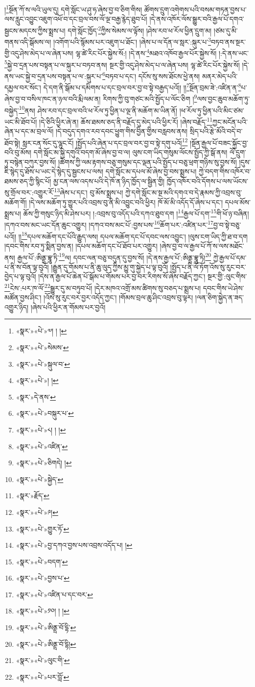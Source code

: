 །\footnote{«སྣར་»«པེ་»༧། ། །}སྔོན་ཀོ་ས་ལའི་ཡུལ་དུ། དགེ་སློང་ཡ་ཤུ་ཧ་ཞེས་བྱ་བ་ཅིག་གིས། ཚོགས་དྲུག་འགེགས་པའི་བསམ་གཏན་བྱས་པ་ལས་རླུང་འབྱུང་འཇུག་འཕོ་བ་དང་བྲལ་བས་ལོ་ལྔ་བརྒྱ་རྙེད་ཐུབ་པོ། །དེ་ནས་འཁོར་ལོས་སྒྱུར་བའི་རྒྱལ་པོ་དགའ་སྦྱངས་མདངས་ཀྱིས་སྨྲས་པ། དགེ་སློང་ཁྱོད་\footnote{«སྣར་»«པེ་»སེམས་}ཀྱིས་སེམས་ལ་ལྟོས། །ཤེས་རབ་ཕ་རོལ་ཕྱིན་དྲུག་མ། །ཙམ་དུ་མི་གནས་འདི་སྒོམས་ལ། །འགོག་པའི་སྙོམས་པར་འཇུག་པ་ཐོང་། །ཞེས་པ་ལ་དོན་ལ་སླར་:སྐུར་པ་\footnote{«སྣར་»«པེ་»སྐུལ་བ་}བཏབ་ནས་སྔར་གྱི་འདུ་ཤེས་མེད་པ་ལ་ཞེན་པས། ལྷ་ཚེ་རིང་པོར་སྐྱེས་སོ:། །དེ་ནས་\footnote{«སྣར་»«པེ་»། །}མཐའ་འཁོབ་རྒྱལ་པོར་སྐྱེས་སོ། །:དེ་ནས་ཡང་\footnote{«སྣར་»དེ་ནས་}སྐྱེ་བ་དྲན་པས་བསྟན་པ་ལ་སྐུར་པ་བཏབ་ནས། སྔར་གྱི་འདུ་ཤེས་མེད་པ་ལ་ཞེན་པས། ལྷ་ཚེ་རིང་པོར་སྐྱེས་སོ། །དེ་ནས་ཡང་སྐྱེ་བ་དྲན་པས་བསྟན་པ་ལ་:སྐུར་པ་\footnote{«སྣར་»«པེ་»བསྐུར་པ་}བཏབ་པ་དང་། དངོས་སུ་སས་ཐོངས་ཕྱེ་ནས། མནར་མེད་པའི་དམྱལ་བར་སོང་། དེ་དག་ནི་སྒོམ་པ་དམིགས་པ་དང་བྲལ་བར་བྱ་བ་སྟེ་བརྒྱད་པའོ།། །།\footnote{«སྣར་»«པེ་»༨། ། །}སྔོན་བྲམ་ཟེ་:འཛིན་ན་\footnote{«སྣར་»«པེ་»འཛིན་}པ་ཞེས་བྱ་བ་བསིལ་ཁང་ན་ཉལ་བའི་རྨི་ལམ་ན། རིགས་ཀྱི་བུ་གཙང་མའི་སྤྱོད་པ་ལོང་ཅིག །\footnote{«སྣར་»«པེ་»ཅིགདེ། །}ལས་བྱང་ཆུབ་མཆོག་ཏུ་བསྐྱེད་\footnote{«སྣར་»«པེ་»སྐྱེད་}ནས། ཤེས་རབ་དང་བྲལ་བའི་ཕ་རོལ་ཏུ་ཕྱིན་པ་ལྔ་ནི་མཆོག་མ་ཡིན་ནོ། །ཕ་རོལ་ཏུ་ཕྱིན་པའི་མིང་ཙམ་ཡང་མི་ཐོབ་པོ། །དེ་ཅིའི་ཕྱིར་ཞེ་ན། ཆོས་ཐམས་ཅད་ནི་བརྗོད་དུ་མེད་པའི་ཕྱིར་རོ། །ཞེས་བརྗོད་\footnote{«སྣར་»རྗོད་}ཀྱང་མངོན་པའི་ཞེན་པ་དང་མ་བྲལ་ལོ། །དེ་བདུད་དགའ་རབ་དབང་ཕྱུག་གིས་བྱིན་གྱིས་བརླབས་ནས། སྲིད་པའི་རྩེ་མོའི་བདེ་བ་ཐོབ་སྟེ། སླར་ངན་སོང་དུ་ལྷུང་ངོ། །སྤྱོད་པའི་ཞེན་པ་དང་བྲལ་བར་བྱ་བ་སྟེ་དགུ་པའོ།\footnote{«སྣར་»«པེ་»༩།} །སྔོན་རྒྱལ་པོ་བཟང་སྐྱོང་བྱ་བའི་བུ་མོས། དགེ་སློང་མ་སྐྱེ་དགུའི་བདག་མོ་ཞེས་བྱ་བ་ལ། ལུས་ངག་ཡིད་གསུམ་ལོངས་སྤྱོད་ཀྱི་སྒོ་ནས། ལོ་དྲུག་ཏུ་བསྙེན་བཀུར་བྱས་སོ། །ཚོགས་ཀྱི་ལམ་རྟགས་བཅུ་གསུམ་དང་ལྡན་པའི་སྤྱོད་པ་བཅུ་ཕྲག་གཉིས་སུ་བྱས་སོ། །དུས་ཇི་སྙེད་དུ་ཐོས་པ་ཡང་དེ་སྙེད་དུ་སྦྱངས་པ་ལས། དགེ་སློང་མ་དཔལ་མོ་ཞེས་བྱ་བས་སྨྲས་པ། ཀྱེ་བདག་གིས་འཁོར་བ་ཐམས་ཅད་ཀྱི་སྙིང་པོ། མྱ་ངན་ལས་འདས་པའི་དེ་ཁོ་ན་ཉིད་ཁྱོད་ལ་སྦྱིན་གྱི། ཁྱོད་འཁོར་བའི་དོགས་པ་ལས་ཡོངས་སུ་གྲོལ་བར་:འགྱུར་རོ་\footnote{«སྣར་»«པེ་»གྱུར་ཏོ་}ཞེས་པ་དང་། བུ་མོས་སྨྲས་པ། ཀྱེ་དགེ་སློང་མ་སྔ་མའི་དགའ་བ་དེ་རྣམས་ཀྱི་འབྲས་བུ་མཆོག་གོ། །དེ་ལས་མཆོག་ཏུ་གྱུར་པའི་འབྲས་བུ་ནི་མི་འབྱུང་བའི་ཕྱིར། ཁོ་མོ་མི་འདོད་དོ་ཞེས་པ་དང་། དཔལ་མོས་སྨྲས་པ། ཆོས་ཀྱི་གསུང་ཉིད་མི་ཤེས་པར། །:འབྲས་བུ་འདོད་པའི་དཀའ་ཐུབ་དག །\footnote{«སྣར་»«པེ་»བྱ་དཀའ་བྱས་པས་འབྲས་འདོད་པ། །}རྒྱལ་པོ་དག་\footnote{«སྣར་»«པེ་»བདག་}གི་ཕོ་ཉ་བཞིན། །དཀའ་བས་མང་ཡང་དོན་ཆུང་འགྱུར། །དཀའ་བས་མང་པོ་:བྱས་པས་\footnote{«སྣར་»«པེ་»བྱས་པ་}ཆོག་པར་:འཛིན་པར་\footnote{«སྣར་»«པེ་»འཛིན་པ་དང་བར་}བྱ་བ་སྟེ་བཅུ་པའོ།། །།\footnote{«སྣར་»«པེ་»༡༠། ། །}དཔལ་མཆོག་དང་པོའི་རྒྱུད་ལས། དཔལ་མཆོག་དང་པོ་དབང་ལས་འབྱུང་། །ལུས་ངག་ཡིད་ཀྱི་ཐ་བ་དག །དབང་གིས་རབ་ཏུ་སྨིན་བྱས་ན། །དཔལ་མཆོག་དང་པོ་ཐོབ་པར་འགྱུར། །ཞེས་བྱ་བ་ལ་རྒྱལ་པོ་ཀོ་ས་ལས་མཐོང་ནས། རྒྱལ་པོ་:ཨིནྡྲ་བྷཱུ་ཏི་\footnote{«སྣར་»«པེ་»ཨིནྡྲ་བོ་དྷི་}ལ། དབང་ལན་བཅུ་བདུན་དུ་བྱས་སོ། །དེ་ནས་རྒྱལ་པོ་:ཨིནྡྲ་བྷཱུ་ཏི།\footnote{«སྣར་»«པེ་»ཨིནྡྲ་བོ་དྷི།} ཀྱེ་རྒྱལ་པོ་དམ་པ་ནི་ས་བོན་ལྟ་བུའོ། །རྒྱུན་དུ་གོམས་པ་ནི་ཆུ་ལུད་ཀྱིས་མྱུ་གུ་སྐྱེད་པ་ལྟ་བུའོ། །སྤྱོད་པ་ནི་ལོ་ཏོག་འོས་སུ་རུང་བར་བྱེད་པ་ལྟ་བུའོ། །དེས་ན་རྒྱལ་པོ་ཆེན་པོ་སྒོམ་པ་གོམས་པར་བྱ་བར་རིགས་སོ་ཞེས་བརྗོད་ཀྱང་། སྔར་གྱི་:ལུང་གིས་\footnote{«སྣར་»«པེ་»ལུང་གི་}ངེས་:པར་ཁ་ལོ་\footnote{«སྣར་»«པེ་»པར་བློ་}སྒྱུར་དུ་མ་བཏུབ་པོ། །དེར་མཁའ་འགྲོ་མས་ཚིགས་སུ་བཅད་པ་སྨྲས་པ། དབང་གིས་ཡེ་ཤེས་མཚོན་བྱས་ཤིང་། །འོས་སུ་རུང་བར་བྱར་འདོད་ཀྱང་། །གོམས་བྲལ་ཆུ་ཤིང་འབྲས་བུ་ལྟར། །ལན་ཅིག་སྐྱེད་ན་ཟད་འགྱུར་ཉིད། །ཞེས་པའི་ཕྱིར་ན་གོམས་པར་བྱའོ། 